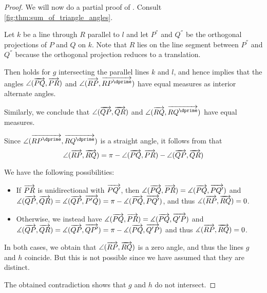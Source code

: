 \begin{proof}
  We will now do a partial proof of . Consult \cref{fig:thm:sum_of_triangle_angles}.

  Let \( k \) be a line through \( R \) parallel to \( l \) and let \( P^\dprime \) and \( Q^\dprime \) be the orthogonal projections of \( P \) and \( Q \) on \( k \). Note that \( R \) lies on the line segment between \( P^\dprime \) and \( Q^\dprime \) because the orthogonal projection reduces to a translation.

  Then  holds for \( g \) intersecting the parallel lines \( k \) and \( l \), and hence  implies that the angles \( \angle(\overrightarrow{PQ}, \overrightarrow{PR}) \) and \( \angle(\vect{RP}, \vect{RP^\dprime}) \) have equal measures as interior alternate angles.

  Similarly, we conclude that \( \angle(\overrightarrow{QP}, \overrightarrow{QR}) \) and \( \angle(\vect{RQ}, \vect{RQ^\dprime}) \) have equal measures.

  Since \( \angle(\vect{RP^\dprime}, \vect{RQ^\dprime}) \) is a straight angle, it follows from  that
  \begin{equation*}
    \angle(\overrightarrow{RP}, \overrightarrow{RQ}) = \pi - \angle(\overrightarrow{PQ}, \overrightarrow{PR}) - \angle(\overrightarrow{QP}, \overrightarrow{QR})
  \end{equation*}

  We have the following possibilities:
  \begin{itemize}
    \item If \( \overrightarrow{PR} \) is unidirectional with \( \overrightarrow{PQ'} \), then \( \measuredangle(\overrightarrow{PQ}, \overrightarrow{PR}) = \measuredangle(\overrightarrow{PQ}, \overrightarrow{PQ'}) \) and \( \measuredangle(\overrightarrow{QP}, \overrightarrow{QR}) = \measuredangle(\overrightarrow{QP}, \overrightarrow{P'Q}) = \pi - \measuredangle(\overrightarrow{PQ}, \overrightarrow{PQ'}) \), and thus \( \measuredangle(\overrightarrow{RP}, \overrightarrow{RQ}) = 0 \).

    \item Otherwise, we instead have \( \measuredangle(\overrightarrow{PQ}, \overrightarrow{PR}) = \measuredangle(\overrightarrow{PQ}, \overrightarrow{Q'P}) \) and \( \measuredangle(\overrightarrow{QP}, \overrightarrow{QR}) = \measuredangle(\overrightarrow{QP}, \overrightarrow{QP'}) = \pi - \measuredangle(\overrightarrow{PQ}, \overrightarrow{Q'P}) \) and thus \( \measuredangle(\overrightarrow{RP}, \overrightarrow{RQ}) = 0 \).
  \end{itemize}

  In both cases, we obtain that \( \angle(\overrightarrow{RP}, \overrightarrow{RQ}) \) is a zero angle, and thus the lines \( g \) and \( h \) coincide. But this is not possible since we have assumed that they are distinct.

  The obtained contradiction shows that \( g \) and \( h \) do not intersect.
\end{proof}
